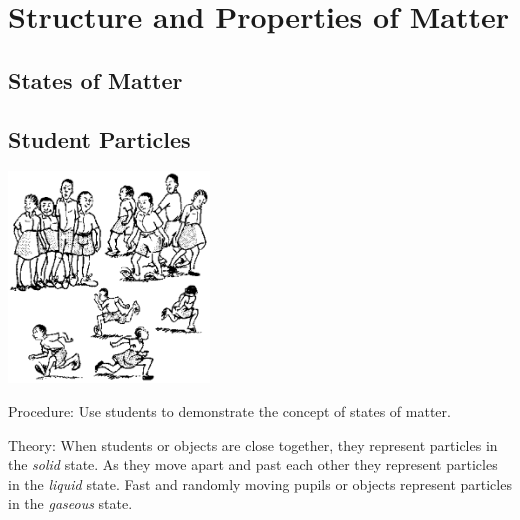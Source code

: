 \section{Structure and Properties of Matter}

\begin{multicols}{2}

\section*{States of Matter} \label{sec:states-matter} 


\subsection{Student Particles}

\begin{center}
\includegraphics[width=0.4\textwidth]{./img/source/states-matter.png}
\end{center}

\begin{description*}
\item[Procedure:]{Use students to demonstrate the concept of states of matter.}
\item[Theory:]{When students or objects are close together, they represent particles in the \emph{solid} state. As they move apart and past each other they represent particles in the \emph{liquid} state. Fast and randomly moving pupils or objects represent particles in the \emph{gaseous} state.}
\end{description*}


\end{multicols}
